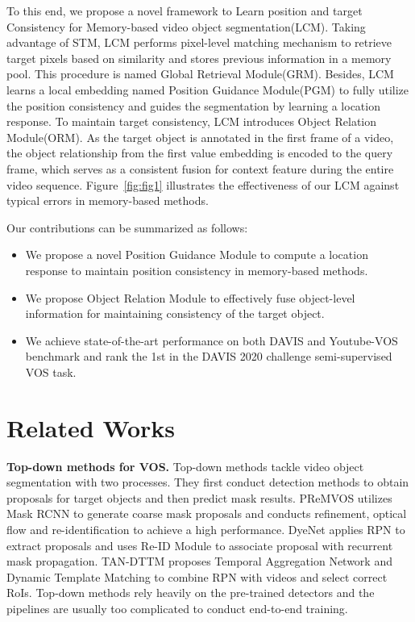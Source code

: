 \documentclass[final]{cvpr}
\begin{document}
To this end, we propose a novel framework to Learn position and target Consistency for Memory-based video object segmentation(LCM).  
Taking advantage of STM, LCM performs pixel-level matching mechanism to retrieve target pixels based on similarity and stores previous information in a memory pool. This procedure is named Global Retrieval Module(GRM). Besides, LCM learns a local embedding named Position Guidance Module(PGM) to fully utilize the position consistency and guides the segmentation by learning a location response. To maintain target consistency, LCM introduces Object Relation Module(ORM). As the target object is annotated in the first frame of a video, the object relationship from the first value embedding is encoded to the query frame, which serves as a consistent fusion for context feature during the entire video sequence. Figure~\ref{fig:fig1} illustrates the effectiveness of our LCM against typical errors in memory-based methods.

Our contributions can be summarized as follows:
\begin{itemize}
\item We propose a novel Position Guidance Module to compute a location response to maintain position consistency in memory-based methods. 
\item We propose Object Relation Module to effectively fuse object-level information for maintaining consistency of the target object. 
\item We achieve state-of-the-art performance on both DAVIS and Youtube-VOS benchmark and rank the 1st in the DAVIS 2020 challenge semi-supervised VOS task.
\end{itemize}


\section{Related Works}
\textbf{Top-down methods for VOS. }
Top-down methods tackle video object segmentation with two processes. They first conduct detection methods to obtain proposals for target objects and then predict mask results. PReMVOS\cite{premvos} utilizes Mask RCNN\cite{maskrcnn} to generate coarse mask proposals and conducts refinement, optical flow and re-identification to achieve a high performance. DyeNet\cite{DyeNet} applies RPN\cite{fasterrcnn} to extract proposals and uses Re-ID Module to associate proposal with recurrent mask propagation. TAN-DTTM\cite{TAN-DTTM} proposes Temporal Aggregation Network and Dynamic Template Matching to combine RPN with videos and select correct RoIs. 
Top-down methods rely heavily on the pre-trained detectors and the pipelines are usually too complicated to conduct end-to-end training.
\end{document}
